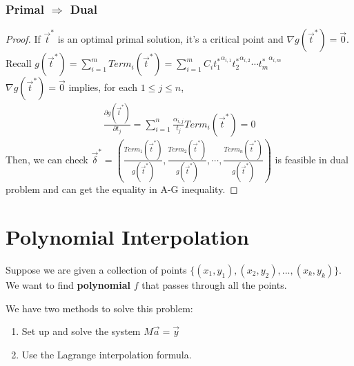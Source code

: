 \documentclass[11pt,a4paper]{article}
\newtheorem{theorem}{Theorem}
\begin{document}
\subsubsection*{Primal $\Rightarrow$ Dual}
\begin{center}
\end{center}
\begin{proof}
    If $\vec{t}^*$ is an optimal primal solution, it's a critical point and $\nabla g(\vec{t}^*)=\vec{0}$. Recall $g(\vec{t}^*)=\sum_{i=1}^m{Term}_i(\vec{t}^*)=\sum_{i=1}^mC_i{t_1^*}^{\alpha_{i,1}}{t_2^*}^{\alpha_{i,2}}\cdots {t_m^*}^{\alpha_{i,m}}$\\
    $\nabla g(\vec{t}^*)=\vec{0}$ implies, for each $1\leq j\leq n$,
    \begin{equation}
        \begin{aligned}
            \frac{\partial g(\vec{t}^*)}{\partial t_j}=\sum_{i=1}^n\frac{\alpha_{i,j}}{t_j}{Term}_i(\vec{t}^*)=0
        \end{aligned}
        \nonumber
    \end{equation}
    Then, we can check $\vec{\delta}^*=\left(\frac{{Term}_1(\vec{t}^*)}{g(\vec{t}^*)},\frac{{Term}_2(\vec{t}^*)}{g(\vec{t}^*)},\cdots,\frac{{Term}_n(\vec{t}^*)}{g(\vec{t}^*)}\right)$ is feasible in dual problem and can get the equality in A-G inequality.
\end{proof}


\section{Polynomial Interpolation}
Suppose we are given a collection of points $\{(x_1,y_1),(x_2,y_2),...,(x_k,y_k)\}$. We want to find \textbf{polynomial} $f$ that passes through all the points.

We have two methods to solve this problem:
\begin{enumerate}[(1)]
    \item Set up and solve the system $M\vec{a}=\vec{y}$
    \item Use the Lagrange interpolation formula.
\end{enumerate}
\end{document}
